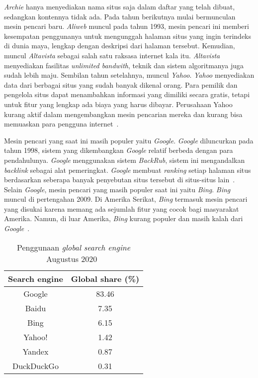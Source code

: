 %
%

\emph{Archie} hanya menyediakan nama situs saja dalam daftar yang telah dibuat, sedangkan kontennya tidak ada. Pada tahun berikutnya mulai bermunculan mesin pencari baru. \emph{Aliweb} muncul pada tahun 1993, mesin pencari ini memberi kesempatan penggunanya untuk mengunggah halaman situs yang ingin terindeks di dunia maya, lengkap dengan deskripsi dari halaman tersebut. Kemudian, muncul \emph{Altavista} sebagai salah satu raksasa internet kala itu. \emph{Altavista} menyediakan fasilitas \emph{unlimited bandwith}, teknik dan sistem algoritmanya juga sudah lebih maju. Sembilan tahun setelahnya, muncul \emph{Yahoo}. \emph{Yahoo} menyediakan data dari berbagai situs yang sudah banyak dikenal orang. Para pemilik dan pengelola situs dapat menambahkan informasi yang dimiliki secara gratis, tetapi untuk fitur yang lengkap ada biaya yang harus dibayar. Perusahaan Yahoo kurang aktif dalam mengembangkan mesin pencarian mereka dan kurang bisa memuaskan para pengguna internet~\cite{seymour2011history}.

Mesin pencari yang saat ini masih populer yaitu \emph{Google}. \emph{Google} diluncurkan pada tahun 1998, sistem yang dikembangkan \emph{Google} relatif berbeda dengan para pendahulunya. \emph{Google} menggunakan sistem \emph{BackRub}, sistem ini mengandalkan \emph{backlink} sebagai alat pemeringkat. \emph{Google} membuat \emph{ranking} setiap halaman situs berdasarkan seberapa banyak penyebutan situs tersebut di situs-situs lain~\cite{brin1998can}. Selain \emph{Google}, mesin pencari yang masih populer saat ini yaitu \emph{Bing}. \emph{Bing} muncul di pertengahan 2009. Di Amerika Serikat, \emph{Bing} termasuk mesin pencari yang disukai karena memang ada sejumlah fitur yang cocok bagi masyarakat Amerika. Namun, di luar Amerika, \emph{Bing} kurang populer dan masih kalah dari \emph{Google}~\cite{seymour2011history}.

\begin{table}[H]
	\centering{}
	\caption{Penggunaan \emph{global search engine} Augustus 2020~\cite{netmarketshare}}\label{searchengine_net}
	\begin{tabular}{c c}
		\toprule
		\textbf{Search engine} & \textbf{Global share (\%)} \\
		\midrule
		Google & 83.46 \\
		\midrule
		Baidu & 7.35 \\
		\midrule
		Bing & 6.15 \\
		\midrule
		Yahoo! & 1.42 \\
		\midrule
		Yandex & 0.87 \\
		\midrule
		DuckDuckGo & 0.31 \\
		\bottomrule
	\end{tabular}
\end{table}

